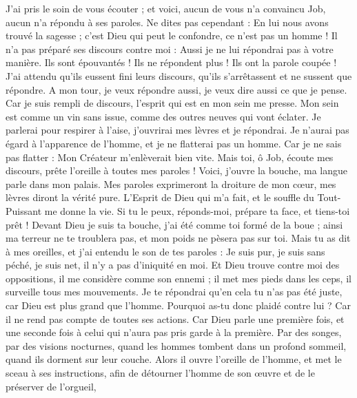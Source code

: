 \begin{multicols}{2}
J'ai pris le soin de vous écouter ; et voici, aucun de vous n'a convaincu Job, aucun n'a répondu à ses paroles.
Ne dites pas cependant : En lui nous avons trouvé la sagesse ; c'est Dieu qui peut le confondre, ce n'est pas un homme !
Il n'a pas préparé ses discours contre moi : Aussi je ne lui répondrai pas à votre manière.
Ils sont épouvantés ! Ils ne répondent plus ! Ils ont la parole coupée !
J'ai attendu qu'ils eussent fini leurs discours, qu'ils s'arrêtassent et ne sussent que répondre.
A mon tour, je veux répondre aussi, je veux dire aussi ce que je pense.
Car je suis rempli de discours, l'esprit qui est en mon sein me presse.
Mon sein est comme un vin sans issue, comme des outres neuves qui vont éclater.
Je parlerai pour respirer à l'aise, j'ouvrirai mes lèvres et je répondrai.
Je n'aurai pas égard à l'apparence de l'homme, et je ne flatterai pas un homme.
Car je ne sais pas flatter : Mon Créateur m'enlèverait bien vite.
\VerseOne{}Mais toi, ô Job, écoute mes discours, prête l'oreille à toutes mes paroles !
Voici, j'ouvre la bouche, ma langue parle dans mon palais.
Mes paroles exprimeront la droiture de mon cœur, mes lèvres diront la vérité pure.
L'Esprit de Dieu qui m'a fait, et le souffle du Tout-Puissant me donne la vie.
Si tu le peux, réponds-moi, prépare ta face, et tiens-toi prêt !
Devant Dieu je suis ta bouche, j'ai été comme toi formé de la boue ;
ainsi ma terreur ne te troublera pas, et mon poids ne pèsera pas sur toi.
Mais tu as dit à mes oreilles, et j'ai entendu le son de tes paroles :
Je suis pur, je suis sans péché, je suis net, il n'y a pas d'iniquité en moi.
Et Dieu trouve contre moi des oppositions, il me considère comme son ennemi ;
il met mes pieds dans les ceps, il surveille tous mes mouvements.
Je te répondrai qu'en cela tu n'as pas été juste, car Dieu est plus grand que l'homme.
Pourquoi as-tu donc plaidé contre lui ? Car il ne rend pas compte de toutes ses actions.
Car Dieu parle une première fois, et une seconde fois à celui qui n'aura pas pris garde à la première.
Par des songes, par des visions nocturnes, quand les hommes tombent dans un profond sommeil, quand ils dorment sur leur couche.
Alors il ouvre l'oreille de l'homme, et met le sceau à ses instructions,
afin de détourner l'homme de son œuvre et de le préserver de l'orgueil,

\end{multicols}
